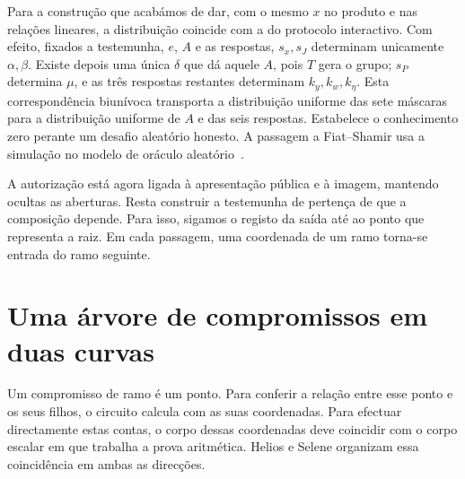 Para a construção que acabámos de dar, com o mesmo \(x\) no
produto e nas relações lineares, a distribuição coincide com
a do protocolo interactivo. Com efeito, fixados a testemunha,
\(e\), \(A\) e as respostas, \(s_x,s_J\) determinam
unicamente \(\alpha,\beta\). Existe depois uma única
\(\delta\) que dá aquele \(A\), pois \(T\) gera o grupo;
\(s_P\) determina \(\mu\), e as três respostas restantes
determinam \(k_y,k_w,k_\eta\). Esta correspondência biunívoca
transporta a distribuição uniforme das sete máscaras para a
distribuição uniforme de \(A\) e das seis respostas. Estabelece
o conhecimento zero perante um desafio aleatório honesto.
A passagem a Fiat--Shamir usa a simulação no modelo de oráculo
aleatório~\cite{fcmp-composition-review}.

A autorização está agora ligada à apresentação pública e à
imagem, mantendo ocultas as aberturas. Resta construir a
testemunha de pertença de que a composição depende. Para isso,
sigamos o registo da saída até ao ponto que representa a raiz.
Em cada passagem, uma coordenada de um ramo torna-se entrada do ramo seguinte.

\section{Uma árvore de compromissos em duas curvas}
\label{sec:fcmp-curve-cycle}
\label{sec:fcmp-leaf-construction}
\label{sec:fcmp-tree-nodes}
\label{sec:fcmp-masked-path}

Um compromisso de ramo é um ponto. Para conferir a relação
entre esse ponto e os seus filhos, o circuito calcula com as
suas coordenadas. Para efectuar directamente estas contas,
o corpo dessas coordenadas deve coincidir com o corpo
escalar em que trabalha a prova aritmética. Helios e Selene
organizam essa coincidência em ambas as direcções.

